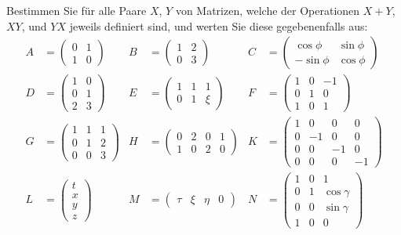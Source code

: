 Bestimmen Sie für alle Paare $X$, $Y$ von Matrizen, welche der Operationen $X+Y$, $XY$, und $YX$ jeweils definiert sind, und werten Sie diese gegebenenfalls aus:
\\
\begin{align*}
A &= \left(\begin{array}{cc}0&1\\1&0\end{array}\right)
&B &= \left(\begin{array}{cc}1&2\\0&3\end{array}\right)
&C &= \left(\begin{array}{cc}\cos\phi&\sin\phi\\-\sin\phi&\cos\phi\end{array}\right)\\
D &= \left(\begin{array}{cc}1&0\\0&1\\2&3\end{array}\right)
&E &= \left(\begin{array}{ccc}1&1&1\\0&1&\xi\end{array}\right)
&F &= \left(\begin{array}{ccc}1&0&-1\\0&1&0\\1&0&1\end{array}\right)\\
G &= \left(\begin{array}{ccc}1&1&1\\0&1&2\\0&0&3\end{array}\right)
&H &= \left(\begin{array}{cccc}0&2&0&1\\1&0&2&0\end{array}\right)
&K &= \left(\begin{array}{cccc}1&0&0&0\\0&-1&0&0\\0&0&-1&0\\0&0&0&-1\end{array}\right)\\
L &= \left(\begin{array}{c}t\\x\\y\\z\end{array}\right)
&M &= \left(\begin{array}{cccc}\tau&\xi&\eta&0\end{array}\right)
&N &= \left(\begin{array}{ccc}1&0&1\\0&1&\cos\gamma\\0&0&\sin\gamma\\1&0&0\end{array}\right)
\end{align*}



